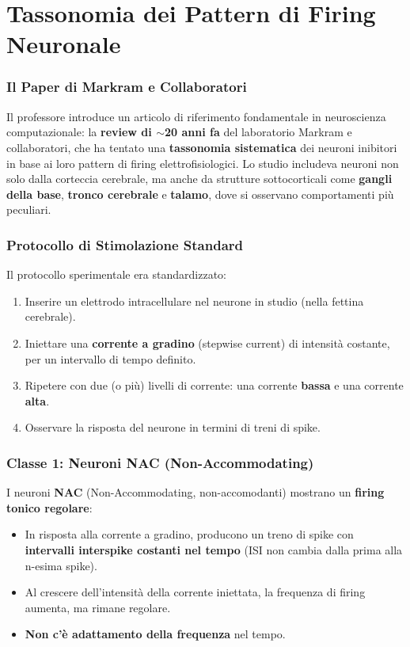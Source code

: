 \section{Tassonomia dei Pattern di Firing Neuronale}

\subsubsection{Il Paper di Markram e Collaboratori}

Il professore introduce un articolo di riferimento fondamentale in neuroscienza computazionale: la \textbf{review di $\sim$20 anni fa} del laboratorio Markram e collaboratori, che ha tentato una \textbf{tassonomia sistematica} dei neuroni inibitori in base ai loro pattern di firing elettrofisiologici. Lo studio includeva neuroni non solo dalla corteccia cerebrale, ma anche da strutture sottocorticali come \textbf{gangli della base}, \textbf{tronco cerebrale} e \textbf{talamo}, dove si osservano comportamenti più peculiari.

\subsubsection{Protocollo di Stimolazione Standard}

Il protocollo sperimentale era standardizzato:

\begin{enumerate}
    \item Inserire un elettrodo intracellulare nel neurone in studio (nella fettina cerebrale).
    \item Iniettare una \textbf{corrente a gradino} (stepwise current) di intensità costante, per un intervallo di tempo definito.
    \item Ripetere con due (o più) livelli di corrente: una corrente \textbf{bassa} e una corrente \textbf{alta}.
    \item Osservare la risposta del neurone in termini di treni di spike.
\end{enumerate}

\subsubsection{Classe 1: Neuroni NAC (Non-Accommodating)}

I neuroni \textbf{NAC} (Non-Accommodating, non-accomodanti) mostrano un \textbf{firing tonico regolare}:

\begin{itemize}
    \item In risposta alla corrente a gradino, producono un treno di spike con \textbf{intervalli interspike costanti nel tempo} (ISI non cambia dalla prima alla n-esima spike).
    \item Al crescere dell'intensità della corrente iniettata, la frequenza di firing aumenta, ma rimane regolare.
    \item \textbf{Non c'è adattamento della frequenza} nel tempo.
\end{itemize}

